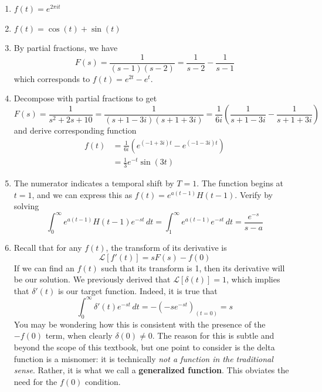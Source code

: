 \documentclass[a4paper]{article}
\begin{document}
\begin{enumerate}[label=(\alph*)]
	\item \( f \!\left( t \right) = e^{2 \pi i t} \)
	\item \( f \!\left( t \right) = \cos\!\left(t\right) + \sin\!\left(t\right) \)
	\item By partial fractions, we have
	\[
		F \!\left( s \right) = \frac{1}{\!\left( s - 1 \right)\!\left( s - 2 \right)} = \frac{1}{s - 2} - \frac{1}{s - 1} 
	\]
	which corresponds to \( f \!\left( t \right) = e^{2t} - e^{t} \).
	\item Decompose with partial fractions to get
	\[
		F \!\left( s \right) = \frac{1}{s^{2} + 2s + 10} = \frac{1}{\!\left( s + 1 - 3i \right)\!\left( s + 1 + 3i \right)} = \frac{1}{6i} \!\left( \frac{1}{s + 1 - 3i} - \frac{1}{s + 1 + 3i} \right)
	\]
	and derive corresponding function
	\begin{align*}
		f \!\left( t \right) & = \frac{1}{6i}\!\left( e^{\!\left( -1 + 3i \right)t} - e^{\!\left( -1 - 3i \right)t} \right) \\
				     & = \frac{1}{3}e^{-t}\sin\!\left(3t\right) 
	\end{align*}
	\item The numerator indicates a temporal shift by \( T = 1 \). The function begins at \( t = 1 \), and we can express this as \( f \!\left( t \right) = e^{a \!\left( t - 1 \right)}H \!\left( t - 1 \right) \). Verify by solving
	\[
		\int^{\infty}_{0} e^{a \!\left( t - 1 \right)}H \!\left( t - 1 \right)e^{-st} \, dt = \int^{\infty}_{1} e^{a \!\left( t - 1 \right)}e^{-st} \, dt = \frac{e^{-s}}{s - a}   
	\]
	\item Recall that for any \( f \!\left( t \right) \), the transform of its derivative is
	\[
		\mathcal{L}\!\left[ f'\!\left( t \right) \right] = sF \!\left( s \right) - f \!\left( 0 \right) 
	\]
	If we can find an \( f \!\left( t \right) \) such that its transform is 1, then its derivative will be our solution. We previously derived that \( \mathcal{L}\!\left[ \delta \!\left( t \right) \right] = 1 \), which implies that \( \delta'\!\left( t \right) \) is our target function. Indeed, it is true that
	\[
		\int^{\infty}_{0} \delta'\!\left( t \right)e^{-st} \, dt = -\!\left( -se^{-st} \right)_{\!\left( t = 0 \right)} = s  
	\]
	You may be wondering how this is consistent with the presence of the \( -f \!\left( 0 \right) \) term, when clearly \( \delta \!\left( 0 \right) \neq 0 \). The reason for this is subtle and beyond the scope of this textbook, but one point to consider is the delta function is a misnomer: it is technically \textit{not a function in the traditional sense}. Rather, it is what we call a \textbf{generalized function}. This obviates the need for the \( f \!\left( 0 \right) \) condition.
\end{enumerate}
\end{document}
